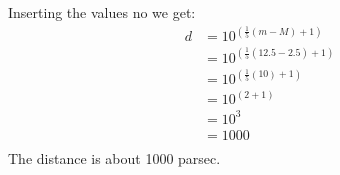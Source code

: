 Inserting the values no we get:
\begin{equation*}
  \begin{split}
    d &= 10^{(\frac{1}{5} (m - M) + 1)}\\
      &= 10^{(\frac{1}{5} (12.5 - 2.5) + 1)}\\
      &= 10^{(\frac{1}{5} (10) + 1)}\\
      &= 10^{(2 + 1)}\\
      &= 10^{3}\\
      &= 1000\\
  \end{split}
\end{equation*}
The distance is about 1000 parsec.

